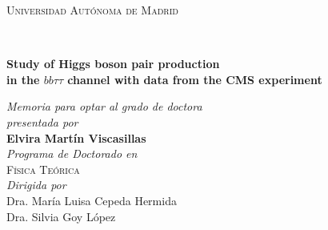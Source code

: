 \begin{titlepage}
  \begin{center}
    \vspace*{1cm}
    
    
    \begin{large}
      \textsc{Universidad Autónoma de Madrid}
    \end{large}\\[2.5cm]
    
    \begin{Huge}
      \textbf{Study of Higgs boson pair production \\
      in the $bb\tau\tau$ channel with data from the CMS experiment} \\[0.8cm]
    \end{Huge}
    
    
    \vfill
    
    \begin{large}
      \emph{Memoria para optar al grado de doctora \\ presentada por}\\[0.5cm]
      \textbf{Elvira Martín Viscasillas}\\[1.5cm]
      
      \emph{Programa de Doctorado en}\\[0.3cm]
      \textsc{Física Teórica}\\[1.5cm]
      
      \emph{Dirigida por}\\[0.3cm]
      Dra. María Luisa Cepeda Hermida\\
      Dra. Silvia Goy López
    \end{large}
    
    \vfill
    
    \begin{large}
    \end{large}
  \end{center}
\end{titlepage}

\newpage
\null
\thispagestyle{empty}
\newpage
